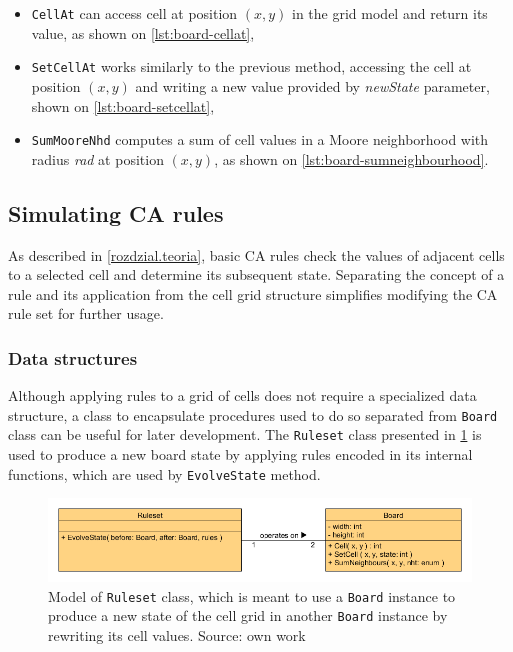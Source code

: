 \documentclass[12pt]{report}
\begin{document}
\begin{itemize}
	\item \texttt{CellAt} can access cell at position $(x,y)$ in the grid model and return its value, as shown on \cref{lst:board-cellat},
	\item \texttt{SetCellAt} works similarly to the previous method, accessing the cell at position $(x,y)$ and writing a new value provided by \textit{newState} parameter, shown on \cref{lst:board-setcellat},
	\item \texttt{SumMooreNhd} computes a sum of cell values in a Moore neighborhood with radius \textit{rad} at position $(x,y)$, as shown on \cref{lst:board-sumneighbourhood}.
\end{itemize}
 
\pagebreak


 
\subsection{Simulating CA rules} 

As described in \cref{rozdzial.teoria}, basic CA rules check the values of adjacent cells to a selected cell and determine its subsequent state. Separating the concept of a rule and its application from the cell grid structure simplifies modifying the CA rule set for further usage.

\subsubsection{Data structures}

Although applying rules to a grid of cells does not require a specialized data structure, a class to encapsulate procedures used to do so separated from \texttt{Board} class can be useful for later development. The \texttt{Ruleset} class presented in \cref{fig:ruleset-board} is used to produce a new board state by applying rules encoded in its internal functions, which are used by \texttt{EvolveState} method.

\begin{figure}[H]
	\centering
	\includegraphics[width=0.9\linewidth]{diagrams/ruleset-board}
	\caption{Model of \texttt{Ruleset} class, which is meant to use a \texttt{Board} instance to produce a new state of the cell grid in another \texttt{Board} instance by rewriting its cell values. Source: own work}
	\label{fig:ruleset-board}
\end{figure}
\end{document}
